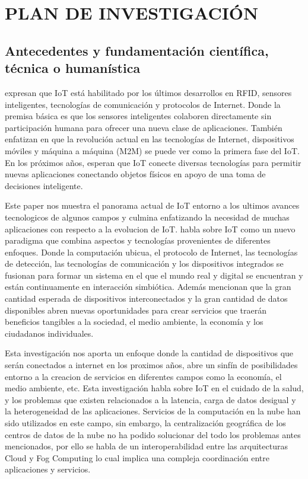 \newpage

\section{PLAN DE INVESTIGACIÓN}
    \subsection{Antecedentes y fundamentación científica, técnica o humanística}
        \vskip 0.3cm
        {\bf\cite{alfuqaha2015}} expresan que IoT está habilitado por los últimos desarrollos en RFID, sensores inteligentes, tecnologías de comunicación y protocolos de Internet. Donde la premisa básica es que los sensores inteligentes colaboren directamente sin participación humana para ofrecer una nueva clase de aplicaciones. También enfatizan en que la revolución actual en las tecnologías de Internet, dispositivos móviles y máquina a máquina (M2M) se puede ver como la primera fase del IoT. En los próximos años,  esperan que IoT conecte diversas tecnologías para permitir nuevas aplicaciones conectando objetos físicos en apoyo de una toma de decisiones inteligente.\par
        Este paper nos muestra el panorama actual de IoT entorno a los ultimos avances tecnologicos de algunos campos y culmina enfatizando la necesidad de muchas aplicaciones con respecto a la evolucion de IoT.
        \vskip 0.3cm
        {\bf\cite{borgia2014}} habla sobre IoT como un nuevo paradigma que combina aspectos y tecnologías provenientes de diferentes enfoques. Donde la computación ubicua, el protocolo de Internet, las tecnologías de detección, las tecnologías de comunicación y los dispositivos integrados se fusionan para formar un sistema en el que el mundo real y digital se encuentran y están continuamente en interacción simbiótica. Además mencionan que la gran cantidad esperada de dispositivos interconectados y la gran cantidad de datos disponibles abren nuevas oportunidades para crear servicios que traerán beneficios tangibles a la sociedad, el medio ambiente, la economía y los ciudadanos individuales.\par
        Esta investigación nos aporta un enfoque donde la cantidad de dispositivos que serán conectados a internet en los proximos años, abre un sinfín de posibilidades entorno a la creacion de servicios en diferentes campos como la economía, el medio ambiente, etc.
        \vskip 0.3cm
        {\bf\cite{mahumd2018}} Esta investigación habla sobre IoT en el cuidado de la salud, y los problemas que existen relacionados a la latencia, carga de datos desigual y la heterogeneidad de las aplicaciones. Servicios de la computación en la nube han sido utilizados en este campo, sin embargo, la centralización geográfica de los centros de datos de la nube no ha podido solucionar del todo los problemas antes mencionados, por ello se habla de un interoperabilidad entre las arquitecturas Cloud y Fog Computing lo cual implica una compleja coordinación entre aplicaciones y servicios.\par
